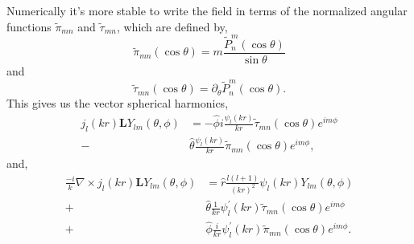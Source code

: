 \documentclass[aps,prl,twocolumn]{revtex4-1}
\begin{document}
Numerically it's more stable to write the field in terms of the normalized
 angular functions $\tilde{\pi}_{mn}$ and $\tilde{\tau}_{mn}$, which
are defined by,
\begin{equation}
  \label{eq:pi_nm}
  \tilde{\pi}_{mn}(\cos \theta) =
              m\frac{ \tilde{P}_n^m (\cos \theta)}{\sin \theta}
\end{equation}
and
\begin{equation}
  \label{eq:pi_nm}
  \tilde{\tau}_{mn}(\cos \theta) = \partial_\theta \tilde{P}_n^m (\cos \theta).
\end{equation}
This gives us the vector spherical harmonics,
\begin{align}
  \label{eq:magneticVSH}
  j_l(kr) \mathbf{L} Y_{lm}(\theta,\phi) &= 
        -\hat{\phi}i\frac{ \psi_l(kr)}{kr} \tilde{\tau}_{mn}(\cos \theta) 
             e^{i m \phi}  \\
   - &\hat{\theta}\frac{ \psi_l(kr)}{kr}\tilde{\pi}_{mn}(\cos \theta)
             e^{i m \phi},
\end{align}
and,
\begin{align}
  \label{eq:electricVSH}
  \frac{-i}{k} \nabla \times j_l(kr) \mathbf{L} Y_{lm}(\theta,\phi) &=
         \hat{r} \frac{l(l+1)}{(kr)^2}\psi_l(kr)Y_{lm}(\theta,\phi) \\
         +&\hat{\theta} \frac{1}{kr} \psi_l^\prime(kr)
                      \tilde{\tau}_{mn}(\cos \theta) 
             e^{i m \phi}  \\
         +&\hat{\phi} \frac{i}{kr} \psi_l^\prime(kr)\tilde{\pi}_{mn}(\cos \theta)
             e^{i m \phi}.
\end{align}
%
%

%

\end{document}
